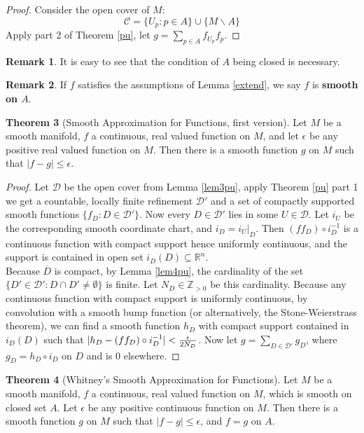 \documentclass{article}
\theoremstyle{definition}
\newtheorem{thm}{Theorem}[section]
\newtheorem{rmk}[thm]{Remark}
\begin{document}
\begin{proof}
Consider the open cover of $M$: 
\[\mathcal{C}=\{U_p: p\in A\}\cup\{M\backslash A\}\]
Apply part 2 of Theorem \ref{pu}, let $g=\sum_{p\in A}f_{U_p}f_p$.
\end{proof}

\begin{rmk}
    It is easy to see that the condition of $A$ being closed is necessary.
\end{rmk}

\begin{rmk}
    If $f$ satisfies the assumptions of Lemma \ref{extend}, we say $f$ is {\bf smooth on $A$}.
\end{rmk}

\begin{thm}[Smooth Approximation for Functions, first version]\label{approx1}
Let $M$ be a smooth manifold, $f$ a continuous, real valued function on $M$, and let $\epsilon$ be any positive real valued function on $M$. Then there is a smooth function $g$ on $M$ such that $|f-g|\leq \epsilon$.
\end{thm}

\begin{proof} Let $\mathcal{D}$ be the open cover from Lemma \ref{lem3pu}, apply Theorem \ref{pu} part 1 we get a countable, locally finite refinement $\mathcal{D}'$ and a set of compactly supported smooth functions $\{f_D: D\in \mathcal{D}'\}$. Now every $D\in\mathcal{D}'$ lies in some $U\in\mathcal{D}$. Let $i_U$ be the corresponding smooth coordinate chart, and $i_D=i_U|_D$. Then $(ff_D)\circ i_D^{-1}$ is a continuous function with compact support hence uniformly continuous, and the support is contained in open set $i_D(D)\subseteq \mathbb{R}^n$.\\

Because $\overline{D}$ is compact, by Lemma \ref{lem4pu}, the cardinality of the set $\{D'\in\mathcal{D}': D\cap D'\not=\emptyset\}$ is finite. Let $N_D\in\mathbb{Z}_{>0}$ be this cardinality. Because any continuous function with compact support is uniformly continuous, by convolution with a smooth bump function (or alternatively, the Stone-Weierstrass theorem), we can find a smooth function $h_D$ with compact support contained in $i_D(D)$ such that $|h_D-(ff_D)\circ i_D^{-1}|<{\epsilon\over 2N_D}$. Now let $g=\sum_{D\in\mathcal{D}'}g_D$, where $g_D=h_D\circ i_D$ on $D$ and is $0$ elsewhere. 
\end{proof}


\begin{thm}[Whitney's Smooth Approximation for Functions]\label{approx2}
Let $M$ be a smooth manifold, $f$ a continuous, real valued function on $M$, which is smooth on closed set $A$. Let $\epsilon$ be any positive continuous function on $M$. Then there is a smooth function $g$ on $M$ such that $|f-g|\leq \epsilon$, and $f=g$ on $A$.
\end{thm}
\end{document}
